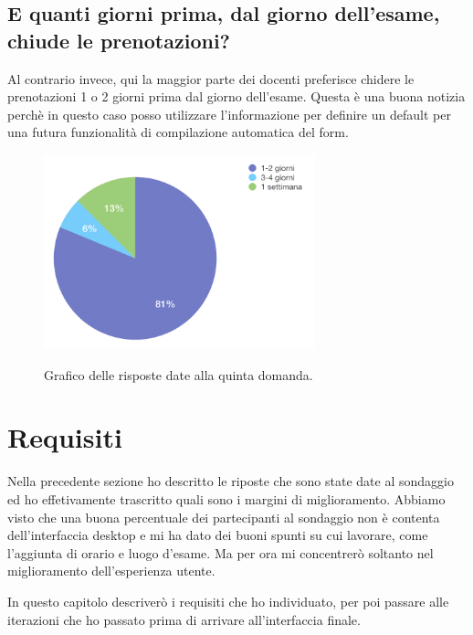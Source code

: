 \documentclass[Lau, oneside]{sapthesis}%
\begin{document}
\subsection{E quanti giorni prima, dal giorno dell’esame, chiude le prenotazioni? }
Al contrario invece, qui la maggior parte dei docenti preferisce chidere le prenotazioni 1 o 2 giorni prima dal giorno dell'esame. Questa è una buona notizia perchè in questo caso posso utilizzare l'informazione per definire un default per una futura funzionalità di compilazione automatica del form.
\begin{figure}[ht]
	\caption{Grafico delle risposte date alla quinta domanda.}
	\centering
	\includegraphics[width=0.7\textwidth]{d-v}
	\label{fig:d-v}
\end{figure}


\section{Requisiti}
\label{sec:req}
Nella precedente sezione ho descritto le riposte che sono state date al sondaggio ed ho effetivamente trascritto quali sono i margini di miglioramento. Abbiamo visto che una buona percentuale dei partecipanti al sondaggio non è contenta dell'interfaccia desktop e mi ha dato dei buoni spunti su cui lavorare, come l'aggiunta di orario e luogo d'esame. Ma per ora mi concentrerò soltanto nel miglioramento dell'esperienza utente.

In questo capitolo descriverò i requisiti che ho individuato, per poi passare alle iterazioni che ho passato prima di arrivare all'interfaccia finale.
\end{document}
